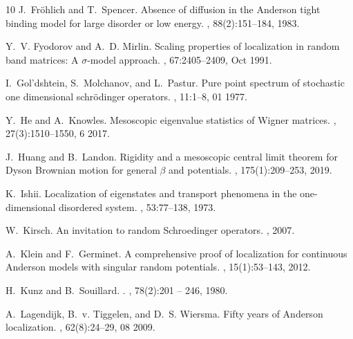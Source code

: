 \documentclass[10pt,reqno]{amsart}
\numberwithin{equation}{section}
\numberwithin{figure}{section}
\theoremstyle{plain} %
\theoremstyle{definition} %
\numberwithin{equation}{section}
\begin{document}
\begin{thebibliography}{10}
	J.~Fr{\"o}hlich and T.~Spencer.
	\newblock Absence of diffusion in the {Anderson} tight binding model for large
	disorder or low energy.
	, 88(2):151--184, 1983.
	
	Y.~V. Fyodorov and A.~D. Mirlin.
	\newblock Scaling properties of localization in random band matrices: A
	\ensuremath{\sigma}-model approach.
	, 67:2405--2409, Oct 1991.
	
	I.~Gol'dshtein, S.~Molchanov, and L.~Pastur.
	\newblock Pure point spectrum of stochastic one dimensional schrödinger
	operators.
	, 11:1--8, 01 1977.
	
	Y.~He and A.~Knowles.
	\newblock Mesoscopic eigenvalue statistics of {W}igner matrices.
	, 27(3):1510--1550, 6 2017.
	
	J.~Huang and B.~Landon.
	\newblock Rigidity and a mesoscopic central limit theorem for {Dyson Brownian
		motion} for general $\beta$ and potentials.
	, 175(1):209--253, 2019.
	
	K.~Ishii.
	\newblock Localization of eigenstates and transport phenomena in the
	one-dimensional disordered system.
	, 53:77--138, 1973.
	
	W.~Kirsch.
	\newblock An invitation to random {S}chroedinger operators.
	, 2007.
	
	A.~Klein and F.~Germinet.
	\newblock A comprehensive proof of localization for continuous {Anderson}
	models with singular random potentials.
	, 15(1):53--143,
	2012.
	
	H.~Kunz and B.~Souillard.
	.
	, 78(2):201 -- 246, 1980.
	
	A.~Lagendijk, B.~v. Tiggelen, and D.~S. Wiersma.
	\newblock Fifty years of {A}nderson localization.
	, 62(8):24--29, 08 2009.
	

\end{thebibliography}
\end{document}

